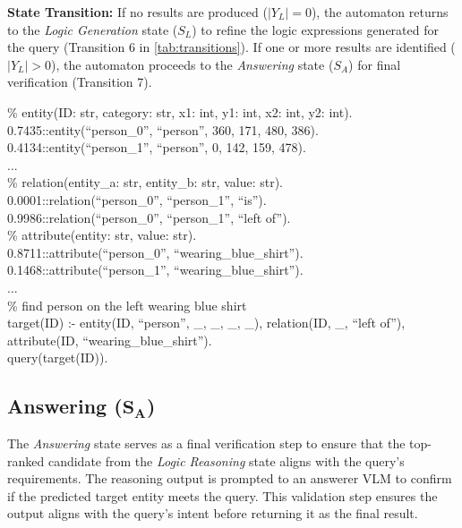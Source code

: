 \textbf{State Transition:} If no results are produced ($|Y_L| = 0$), the automaton returns to the \emph{Logic Generation} state ($S_L$) to refine the logic expressions generated for the query (Transition 6 in \autoref{tab:transitions}). If one or more results are identified ($|Y_L| > 0$), the automaton proceeds to the \emph{Answering} state ($S_A$) for final verification (Transition 7).

\begin{prompt}[title={Code \thetcbcounter: ProbLog Code for Explicit Logic}] \label{code:problog}
\% entity(ID: str, category: str, x1: int, y1: int, x2: int, y2: int).\\
0.7435::entity(``person\_0'', ``person'', 360, 171, 480, 386).\\
0.4134::entity(``person\_1'', ``person'', 0, 142, 159, 478).\\
...\\
\% relation(entity\_a: str, entity\_b: str, value: str).\\
0.0001::relation(``person\_0'', ``person\_1'', ``is'').\\
0.9986::relation(``person\_0'', ``person\_1'', ``left of'').\\
\% attribute(entity: str, value: str).\\
0.8711::attribute(``person\_0'', ``wearing\_blue\_shirt'').\\
0.1468::attribute(``person\_1'', ``wearing\_blue\_shirt'').\\
...\\
\% find person on the left wearing blue shirt\\
target(ID) :- entity(ID, ``person'', \_, \_, \_, \_), relation(ID, \_, ``left of''), attribute(ID, ``wearing\_blue\_shirt'').\\
query(target(ID)).
\end{prompt}

\subsection{Answering (\texorpdfstring{$\boldsymbol{S_A}$}{S\_A})}
\label{sec:answering}

The \emph{Answering} state serves as a final verification step to ensure that the top-ranked candidate from the \emph{Logic Reasoning} state aligns with the query’s requirements. The reasoning output is prompted to an answerer VLM to confirm if the predicted target entity meets the query. This validation step ensures the output aligns with the query’s intent before returning it as the final result.

